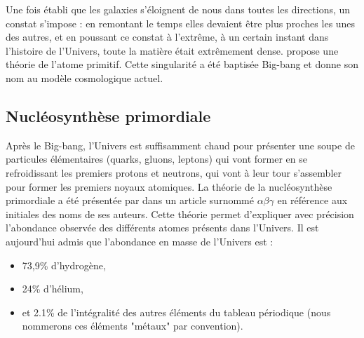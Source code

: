 Une fois établi que les galaxies s'éloignent de nous dans toutes les directions, un constat s'impose : en remontant le temps elles devaient être plus proches les unes des autres, et en poussant ce constat à l’extrême, à un certain instant dans l'histoire de l'Univers, toute la matière était extrêmement dense.
\cite{1927ASSB...47...49L} propose une théorie de l'atome primitif.
Cette singularité a été baptisée Big-bang et donne son nom au modèle cosmologique actuel.

%

\subsection{Nucléosynthèse primordiale}
\label{sec:nucleosynthese_primordiale}
Après le Big-bang, l'Univers est suffisamment chaud pour présenter une soupe de particules élémentaires (quarks, gluons, leptons) qui vont former en se refroidissant les premiers protons et neutrons, qui vont à leur tour s'assembler pour former les premiers noyaux atomiques.
La théorie de la nucléosynthèse primordiale a été présentée par \citep{PhysRev.73.803} dans un article surnommé $\alpha \beta \gamma$ en référence aux initiales des noms de ses auteurs.
Cette théorie permet d'expliquer avec précision l'abondance observée des différents atomes présents dans l'Univers.
Il est aujourd'hui admis que l'abondance en masse de l'Univers est : 

\begin{itemize}
\item 73,9\% d’hydrogène,
\item 24\% d’hélium,
\item et 2.1\% de l'intégralité des autres éléments du tableau périodique (nous nommerons ces éléments "métaux" par convention).
\end{itemize}


